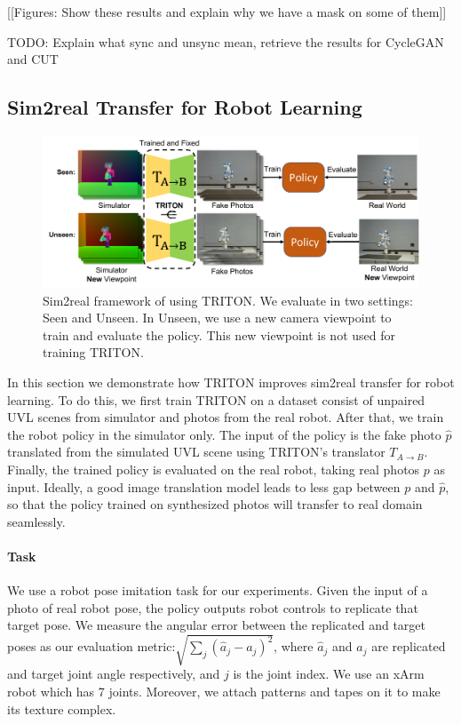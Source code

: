 \documentclass{article}
\begin{document}
[[Figures: Show these results and explain why we have a mask on some of them]]

TODO: Explain what sync and unsync mean, retrieve the results for CycleGAN and CUT

\subsection{Sim2real Transfer for Robot Learning}
\begin{figure}[thbp]
    \centering
    \vspace{-10pt}
    \includegraphics[width=\textwidth]{images/sim2real_framework.pdf}
    \vspace{-20pt}
    \caption{Sim2real framework of using TRITON. We evaluate in two settings: Seen and Unseen. In Unseen, we use a new camera viewpoint to train and evaluate the policy. This new viewpoint is not used for training TRITON. }
    \vspace{-5pt}
    \label{fig:sim2realframework}
\end{figure}
In this section we demonstrate how TRITON improves sim2real transfer for robot learning. To do this, we first train TRITON on a dataset consist of unpaired UVL scenes from simulator and photos from the real robot. After that, we train the robot policy in the simulator only. The input of the policy is the fake photo $\hat{p}$ translated from the simulated UVL scene using TRITON's translator $T_{A\to B}$. Finally, the trained policy is evaluated on the real robot, taking real photos $p$ as input. 
Ideally, a good image translation model leads to less gap between $p$ and $\hat{p}$, so that the policy trained on synthesized photos will transfer to real domain seamlessly. 

\paragraph{Task} We use a robot pose imitation task for our experiments. Given the input of a photo of real robot pose, the policy outputs robot controls to replicate that target pose. We measure the angular error between the replicated and target poses as our evaluation metric:$\sqrt{\sum_{j} (\hat{a}_j - a_j)^2}$,
where $\hat{a}_j$ and $a_j$ are replicated and target joint angle respectively, and $j$ is the joint index. We use an xArm robot which has 7 joints. Moreover, we attach patterns and tapes on it to make its texture complex.
\end{document}
